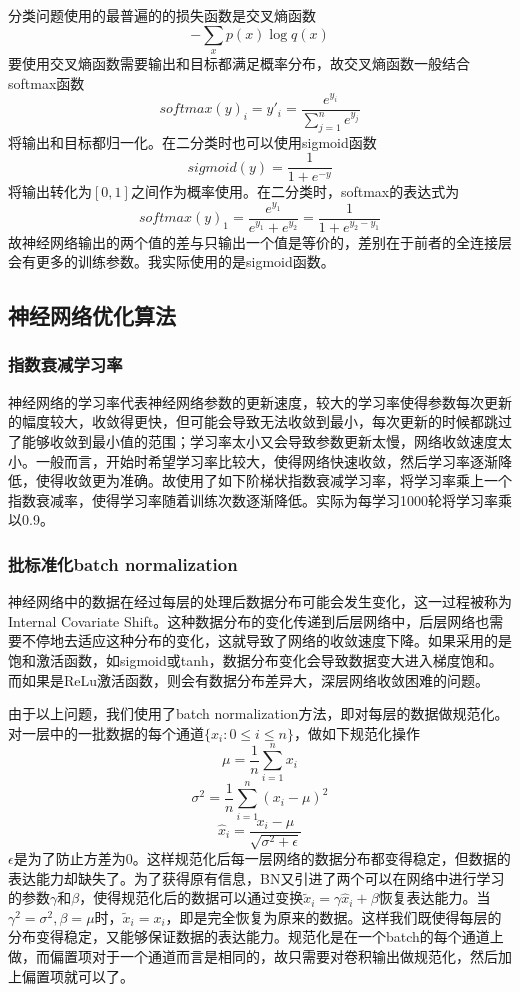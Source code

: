\documentclass[12pt]{article}
\begin{document}
分类问题使用的最普遍的的损失函数是交叉熵函数$$- \sum_x p(x) \log q(x)$$ 要使用交叉熵函数需要输出和目标都满足概率分布，故交叉熵函数一般结合softmax函数$$softmax(y)_i = y'_i = \frac{e^{y_i}}{\sum^n_{j=1} e^{y_j}}$$将输出和目标都归一化。在二分类时也可以使用sigmoid函数$$sigmoid(y) = \frac 1 {1 + e^{-y}}$$将输出转化为$[0, 1]$之间作为概率使用。在二分类时，softmax的表达式为$$softmax(y)_1 = \frac{e^{y_1}}{e^{y_1} + e^{y_2}} = \frac 1 {1 + e^{y_2 - y_1}}$$ 故神经网络输出的两个值的差与只输出一个值是等价的，差别在于前者的全连接层会有更多的训练参数。我实际使用的是sigmoid函数。

\subsection{神经网络优化算法}

\subsubsection{指数衰减学习率}
\noindent

神经网络的学习率代表神经网络参数的更新速度，较大的学习率使得参数每次更新的幅度较大，收敛得更快，但可能会导致无法收敛到最小，每次更新的时候都跳过了能够收敛到最小值的范围；学习率太小又会导致参数更新太慢，网络收敛速度太小。一般而言，开始时希望学习率比较大，使得网络快速收敛，然后学习率逐渐降低，使得收敛更为准确。故使用了如下阶梯状指数衰减学习率，将学习率乘上一个指数衰减率，使得学习率随着训练次数逐渐降低。实际为每学习1000轮将学习率乘以0.9。

\subsubsection{批标准化batch normalization}
\noindent

神经网络中的数据在经过每层的处理后数据分布可能会发生变化，这一过程被称为Internal Covariate Shift\cite{bn}。这种数据分布的变化传递到后层网络中，后层网络也需要不停地去适应这种分布的变化，这就导致了网络的收敛速度下降。如果采用的是饱和激活函数，如sigmoid或tanh，数据分布变化会导致数据变大进入梯度饱和。而如果是ReLu激活函数，则会有数据分布差异大，深层网络收敛困难的问题\cite{bn-relu}。

由于以上问题，我们使用了batch normalization方法，即对每层的数据做规范化。对一层中的一批数据的每个通道$\{x_i : 0 \le i \le n\}$，做如下规范化操作
$$\mu = \frac 1 n \sum^n_{i = 1} x_i$$
$$\sigma^2 = \frac 1 n \sum^n_{i=1}(x_i - \mu)^2$$
$$\hat{x}_i = \frac{x_i - \mu}{\sqrt{\sigma^2 + \epsilon}}$$
$\epsilon$是为了防止方差为0。这样规范化后每一层网络的数据分布都变得稳定，但数据的表达能力却缺失了。为了获得原有信息，BN又引进了两个可以在网络中进行学习的参数$\gamma$和$\beta$，使得规范化后的数据可以通过变换$\tilde{x}_i = \gamma \hat{x}_i + \beta$恢复表达能力。当$\gamma^2 = \sigma^2, \beta = \mu$时，$\tilde{x}_i = x_i$，即是完全恢复为原来的数据。这样我们既使得每层的分布变得稳定，又能够保证数据的表达能力。规范化是在一个batch的每个通道上做，而偏置项对于一个通道而言是相同的，故只需要对卷积输出做规范化，然后加上偏置项就可以了。
\end{document}
